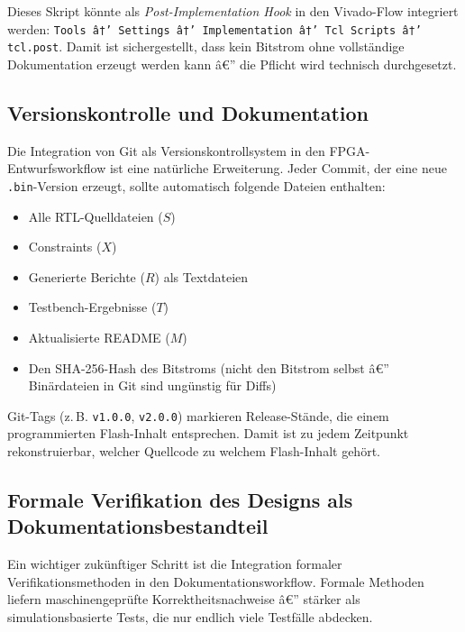 ﻿\documentclass[a4paper,12pt]{article}
\theoremstyle{definition}
\begin{document}
Dieses Skript könnte als \emph{Post-Implementation Hook} in den Vivado-Flow
integriert werden: \texttt{Tools â†’ Settings â†’ Implementation â†’ Tcl Scripts
â†’ tcl.post}. Damit ist sichergestellt, dass kein Bitstrom ohne vollständige
Dokumentation erzeugt werden kann â€” die Pflicht wird technisch durchgesetzt.

\subsection{Versionskontrolle und Dokumentation}

Die Integration von Git als Versionskontrollsystem in den FPGA-Entwurfsworkflow
ist eine natürliche Erweiterung. Jeder Commit, der eine neue \texttt{.bin}-Version
erzeugt, sollte automatisch folgende Dateien enthalten:
\begin{itemize}
    \item Alle RTL-Quelldateien ($S$)
    \item Constraints ($X$)
    \item Generierte Berichte ($R$) als Textdateien
    \item Testbench-Ergebnisse ($T$)
    \item Aktualisierte README ($M$)
    \item Den SHA-256-Hash des Bitstroms (nicht den Bitstrom selbst â€”
          Binärdateien in Git sind ungünstig für Diffs)
\end{itemize}

Git-Tags (z.\,B. \texttt{v1.0.0}, \texttt{v2.0.0}) markieren
Release-Stände, die einem programmierten Flash-Inhalt entsprechen.
Damit ist zu jedem Zeitpunkt rekonstruierbar, welcher Quellcode zu
welchem Flash-Inhalt gehört.

\subsection{Formale Verifikation des Designs als Dokumentationsbestandteil}

Ein wichtiger zukünftiger Schritt ist die Integration formaler
Verifikationsmethoden in den Dokumentationsworkflow. Formale Methoden
liefern maschinengeprüfte Korrektheitsnachweise â€” stärker als
simulationsbasierte Tests, die nur endlich viele Testfälle abdecken.
\end{document}
